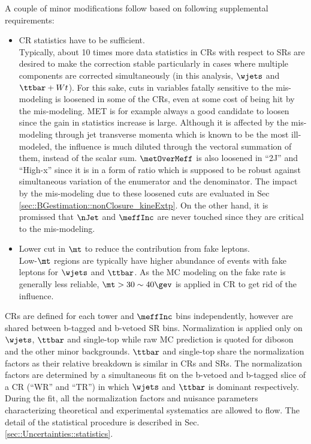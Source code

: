 A couple of minor modifications follow based on following supplemental requirements:
\begin{itemize}
\item CR statistics have to be sufficient. \\
Typically, about 10 times more data statistics in CRs with respect to SRs are desired to make the correction stable particularly in cases where multiple components are corrected simultaneously (in this analysis, $\wjets$ and $\ttbar+Wt$). 
For this sake, cuts in variables fatally sensitive to the mis-modeling is loosened in some of the CRs, even at some cost of being hit by the mis-modeling.
MET is for example always a good candidate to loosen since the gain in statistics increase is large.
Although it is affected by the mis-modeling through jet transverse momenta which is known to be the most ill-modeled, 
the influence is much diluted through the vectoral summation of them, instead of the scalar sum. 
$\metOverMeff$ is also loosened in ``2J'' and ``High-x'' since it is in a form of ratio which is supposed to be robust against simultaneous variation of the enumerator and the denominator.
The impact by the mis-modeling due to these loosened cuts are evaluated in Sec \ref{sec::BGestimation::nonClosure_kineExtp}.
On the other hand, it is promissed that $\nJet$ and $\meffInc$ are never touched since they are critical to the mis-modeling. \\
%
\item Lower cut in $\mt$ to reduce the contribution from fake leptons. \\
Low-$\mt$ regions are typically have higher abundance of events with fake leptons for $\wjets$ and $\ttbar$.
As the MC modeling on the fake rate is generally less reliable, $\mt > 30 \sim 40 \gev$ is applied in CR to get rid of the influence. 
\end{itemize}

CRs are defined for each tower and $\meffInc$ bins independently, however are shared between b-tagged and b-vetoed SR bins.  Normalization is applied only on $\wjets$, $\ttbar$ and single-top while raw MC prediction is quoted for diboson and the other minor backgrounds. $\ttbar$ and single-top share the normalization factors as their relative breakdown is similar in CRs and SRs. 
The normalization factors are determined by a simultaneous fit on the b-vetoed and b-tagged slice of a CR (``WR'' and ``TR'') in which $\wjets$ and $\ttbar$ is dominant respectively. During the fit, all the normalization factors and nuisance parameters characterizing theoretical and experimental systematics are allowed to flow. The detail of the statistical procedure is described in Sec. \ref{sec::Uncertainties::statistics}. \\

